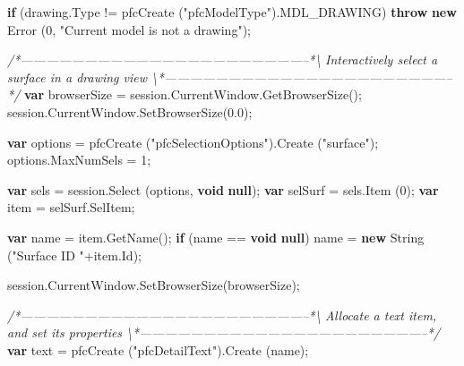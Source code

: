 \documentclass[]{article}
\newenvironment{Shaded}{}{}
\newcommand{\KeywordTok}[1]{\textcolor[rgb]{0.00,0.44,0.13}{\textbf{{#1}}}}
\newcommand{\DecValTok}[1]{\textcolor[rgb]{0.25,0.63,0.44}{{#1}}}
\newcommand{\FloatTok}[1]{\textcolor[rgb]{0.25,0.63,0.44}{{#1}}}
\newcommand{\StringTok}[1]{\textcolor[rgb]{0.25,0.44,0.63}{{#1}}}
\newcommand{\CommentTok}[1]{\textcolor[rgb]{0.38,0.63,0.69}{\textit{{#1}}}}
\newcommand{\OtherTok}[1]{\textcolor[rgb]{0.00,0.44,0.13}{{#1}}}
\newcommand{\FunctionTok}[1]{\textcolor[rgb]{0.02,0.16,0.49}{{#1}}}
\newcommand{\NormalTok}[1]{{#1}}
\begin{document}
\begin{Shaded}
\begin{Highlighting}[]
  \KeywordTok{if} \NormalTok{(}\OtherTok{drawing}\NormalTok{.}\FunctionTok{Type} \NormalTok{!= }\FunctionTok{pfcCreate} \NormalTok{(}\StringTok{"pfcModelType"}\NormalTok{).}\FunctionTok{MDL_DRAWING}\NormalTok{)}
    \KeywordTok{throw} \KeywordTok{new} \FunctionTok{Error} \NormalTok{(}\DecValTok{0}\NormalTok{, }\StringTok{"Current model is not a drawing"}\NormalTok{);}
  
\CommentTok{/*--------------------------------------------------------------------*\textbackslash{}  }
\CommentTok{  Interactively select a surface in a drawing view}
\CommentTok{\textbackslash{}*--------------------------------------------------------------------*/} 
  \KeywordTok{var} \NormalTok{browserSize = }\OtherTok{session}\NormalTok{.}\OtherTok{CurrentWindow}\NormalTok{.}\FunctionTok{GetBrowserSize}\NormalTok{();}
  \OtherTok{session}\NormalTok{.}\OtherTok{CurrentWindow}\NormalTok{.}\FunctionTok{SetBrowserSize}\NormalTok{(}\FloatTok{0.0}\NormalTok{);}
  
  \KeywordTok{var} \NormalTok{options = }\FunctionTok{pfcCreate} \NormalTok{(}\StringTok{"pfcSelectionOptions"}\NormalTok{).}\FunctionTok{Create} \NormalTok{(}\StringTok{"surface"}\NormalTok{);}
  \OtherTok{options}\NormalTok{.}\FunctionTok{MaxNumSels} \NormalTok{= }\DecValTok{1}\NormalTok{;}
  
  \KeywordTok{var} \NormalTok{sels = }\OtherTok{session}\NormalTok{.}\FunctionTok{Select} \NormalTok{(options, }\KeywordTok{void} \KeywordTok{null}\NormalTok{);}
  \KeywordTok{var} \NormalTok{selSurf = }\OtherTok{sels}\NormalTok{.}\FunctionTok{Item} \NormalTok{(}\DecValTok{0}\NormalTok{);}
  \KeywordTok{var} \NormalTok{item = }\OtherTok{selSurf}\NormalTok{.}\FunctionTok{SelItem}\NormalTok{;}
  
  \KeywordTok{var} \NormalTok{name = }\OtherTok{item}\NormalTok{.}\FunctionTok{GetName}\NormalTok{();}
  \KeywordTok{if} \NormalTok{(name == }\KeywordTok{void} \KeywordTok{null}\NormalTok{)}
    \NormalTok{name = }\KeywordTok{new} \FunctionTok{String} \NormalTok{(}\StringTok{"Surface ID "}\NormalTok{+}\OtherTok{item}\NormalTok{.}\FunctionTok{Id}\NormalTok{);}
  
  \OtherTok{session}\NormalTok{.}\OtherTok{CurrentWindow}\NormalTok{.}\FunctionTok{SetBrowserSize}\NormalTok{(browserSize);}
    
\CommentTok{/*--------------------------------------------------------------------*\textbackslash{}  }
\CommentTok{  Allocate a text item, and set its properties}
\CommentTok{\textbackslash{}*--------------------------------------------------------------------*/}   
  \KeywordTok{var} \NormalTok{text = }\FunctionTok{pfcCreate} \NormalTok{(}\StringTok{"pfcDetailText"}\NormalTok{).}\FunctionTok{Create} \NormalTok{(name);}
 

\end{Highlighting}
\end{Shaded}
\end{document}

